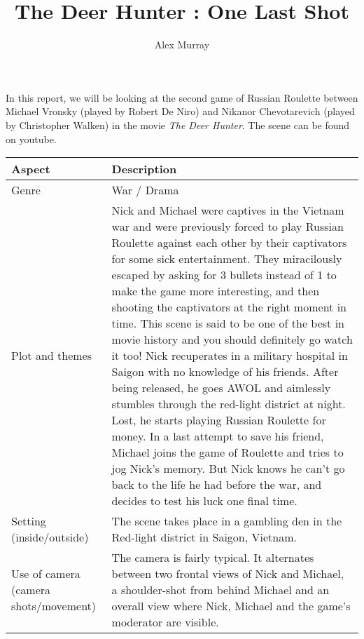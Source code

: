 \documentclass[notitlepage]{fhnwreport}
\title{The Deer Hunter : One Last Shot}
\author{Alex Murray}
\begin{document}
\maketitle

In this report,  we  will  be  looking  at the second game of Russian Roulette
between Michael  Vronsky  (played by Robert De Niro) and Nikanor Chevotarevich
(played by Christopher Walken) in the  movie  \textit{The  Deer  Hunter}.  The
scene can be found on youtube\cite{ref:scene}.

\begin{center}
\begin{threeparttable}
    \begin{tabular}{p{4.2cm}p{11cm}}
        \toprule
        \textbf{Aspect} & \textbf{Description} \\

        \midrule
        Genre & 

War / Drama \\

        \midrule
        Plot and themes &

Nick and Michael were captives in the Vietnam war and were  previously  forced
to play Russian Roulette against each other by their captivators for some sick
entertainment.  They miracilously escaped by asking for 3 bullets instead of 1
to  make the game more interesting, and then shooting the captivators  at  the
right  moment  in  time.  This  scene is said to be one of the best  in  movie
history and you should definitely  go  watch  it  too!  Nick  recuperates in a
military  hospital  in  Saigon  with no knowledge of his friends. After  being
released, he goes AWOL and aimlessly  stumbles  through the red-light district
at night. Lost,  he  starts  playing  Russian  Roulette  for  money. In a last
attempt to save his friend,  Michael  joins  the game of Roulette and tries to
jog Nick's memory. But Nick knows he can't go back to the life he  had  before
the war, and decides to test his luck one final time. \\

        \midrule
        Setting (inside/outside) &

The scene takes place in a gambling den in the Red-light district  in  Saigon,
Vietnam. \\

        \midrule
        Use of camera (camera shots/movement)  &

The camera is fairly typical. It alternates between two  frontal views of Nick
and Michael, a  shoulder-shot  from  behind  Michael and an overall view where
Nick, Michael and the game's moderator are visible. \\


\end{tabular}
\end{threeparttable}
\end{center}
\end{document}
